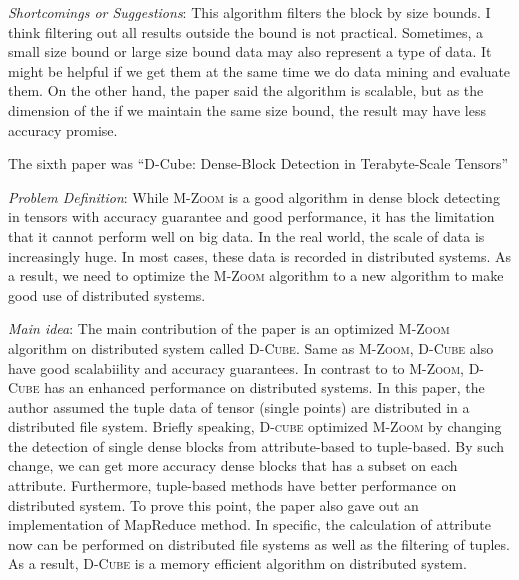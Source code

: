 \begin{itemize*}
\item {\em Shortcomings or Suggestions}:
      This algorithm filters the block by size bounds. I think filtering out all results outside the bound is not practical. Sometimes, a small size bound or large size bound data may also represent a type of data. It might be helpful if we get them at the same time we do data mining and evaluate them. On the other hand, the paper said the algorithm is scalable, but as the dimension of the if we maintain the same size bound, the result may have less accuracy promise.
      
    
      
\end{itemize*}
\newpage
The sixth paper was ``D-Cube: Dense-Block Detection in Terabyte-Scale Tensors''

\begin{itemize*}
\item {\em Problem Definition}: While \textsc{M-Zoom} is a good algorithm in dense block detecting in tensors with accuracy guarantee and good performance, it has the limitation that it cannot perform well on big data. In the real world, the scale of data is increasingly huge. In most cases, these data is recorded in distributed systems. As a result, we need to optimize the \textsc{M-Zoom} algorithm to a new algorithm to make good use of distributed systems.  \\

\item {\em Main idea}: The main contribution of the paper is an optimized \textsc{M-Zoom} algorithm on distributed system called \textsc{D-Cube}. Same as \textsc{M-Zoom}, \textsc{D-Cube} also have good scalabiility and accuracy guarantees. In contrast to to \textsc{M-Zoom}, \textsc{D-Cube} has an enhanced performance on distributed systems. In this paper, the author assumed the tuple data of tensor (single points) are distributed in a distributed file system. Briefly speaking, \textsc{D-cube} optimized \textsc{M-Zoom} by changing the detection of single dense blocks from attribute-based to tuple-based. By such change, we can get more accuracy dense blocks that has a subset on each attribute. Furthermore, tuple-based methods have better performance on distributed system. To prove this point, the paper also gave out an implementation of MapReduce method. In specific, the calculation of attribute now can be performed on distributed file systems as well as the filtering of tuples. As a result, \textsc{D-Cube} is a memory efficient algorithm on distributed system. \\


\end{itemize*}
